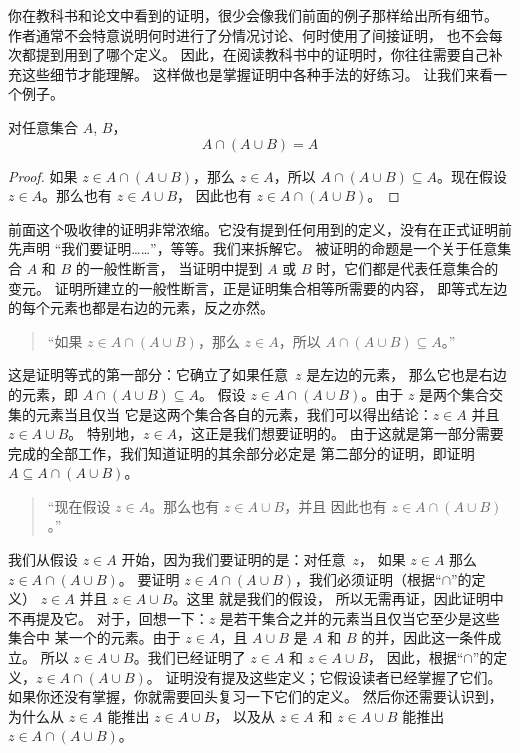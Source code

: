 \documentclass[../../../include/open-logic-section]{subfiles}
\begin{document}

你在教科书和论文中看到的证明，很少会像我们前面的例子那样给出所有细节。
作者通常不会特意说明何时进行了分情况讨论、何时使用了间接证明，
也不会每次都提到用到了哪个定义。
因此，在阅读教科书中的证明时，你往往需要自己补充这些细节才能理解。
这样做也是掌握证明中各种手法的好练习。
让我们来看一个例子。

\begin{prop}[吸收律]
对任意集合 $A$, $B$，
\[
A \cap (A \cup B) = A
\]
\end{prop}

\begin{proof}
如果 $z \in A \cap (A \cup B)$，那么 $z \in A$，所以 $A \cap (A \cup B)
\subseteq A$。现在假设 $z \in A$。那么也有 $z \in A \cup B$，
因此也有 $z \in A \cap (A \cup B)$。
\end{proof}

前面这个吸收律的证明非常浓缩。它没有提到任何用到的定义，没有在正式证明前先声明
“我们要证明……”，等等。我们来拆解它。
被证明的命题是一个关于任意集合 $A$ 和 $B$ 的一般性断言，
当证明中提到 $A$ 或 $B$ 时，它们都是代表任意集合的变元。
证明所建立的一般性断言，正是证明集合相等所需要的内容，
即等式左边的每个元素也都是右边的元素，反之亦然。

\begin{quote}
“如果 $z \in A \cap (A \cup B)$，那么 $z \in A$，所以 $A \cap (A \cup B)
  \subseteq A$。”
\end{quote}

这是证明等式的第一部分：它确立了如果任意~$z$ 是左边的元素，
那么它也是右边的元素，即 $A \cap (A \cup B) \subseteq A$。
假设 $z \in A \cap (A \cup B)$。由于 $z$ 是两个集合交集的元素当且仅当
它是这两个集合各自的元素，我们可以得出结论：$z \in A$ 并且 $z \in A \cup B$。
特别地，$z \in A$，这正是我们想要证明的。
由于这就是第一部分需要完成的全部工作，我们知道证明的其余部分必定是
第二部分的证明，即证明 $A \subseteq A \cap (A \cup B)$。

\begin{quote}
“现在假设 $z \in A$。那么也有 $z \in A \cup B$，并且
因此也有 $z \in A \cap (A \cup B)$。”
\end{quote}

我们从假设 $z \in A$ 开始，因为我们要证明的是：对任意~$z$，
如果 $z \in A$ 那么 $z \in A \cap (A \cup B)$。
要证明 $z \in A \cap (A \cup B)$，我们必须证明（根据“$\cap$”的定义）
 $z \in A$ 并且 $z \in A \cup B$。这里 就是我们的假设，
所以无需再证，因此证明中不再提及它。
对于，回想一下：$z$ 是若干集合之并的元素当且仅当它至少是这些集合中
某一个的元素。由于 $z \in A$，且 $A \cup B$ 是 $A$ 和 $B$ 的并，因此这一条件成立。
所以 $z \in A \cup B$。我们已经证明了 $z \in A$ 和 $z \in A \cup B$，
因此，根据“$\cap$”的定义，$z \in A \cap (A \cup B)$。
证明没有提及这些定义；它假设读者已经掌握了它们。
如果你还没有掌握，你就需要回头复习一下它们的定义。
然后你还需要认识到，为什么从 $z \in A$ 能推出 $z \in A \cup B$，
以及从 $z \in A$ 和 $z \in A \cup B$ 能推出 $z \in A \cap (A \cup B)$。
\end{document}
